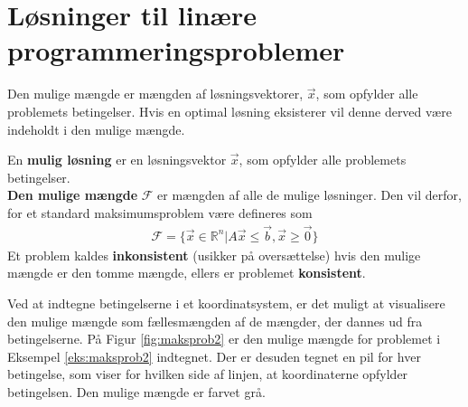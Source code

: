 \section{Løsninger til linære programmeringsproblemer}

Den mulige mængde er mængden af løsningsvektorer, $\vec{x}$, som opfylder alle problemets betingelser. Hvis en optimal løsning eksisterer vil denne derved være indeholdt i den mulige mængde.

\begin{defn}
En \textbf{mulig løsning} er en løsningsvektor $\vec{x}$, som opfylder alle problemets betingelser.\\
\textbf{Den mulige mængde} $\mathcal{F}$ er mængden af alle de mulige løsninger. Den vil derfor, for et standard maksimumsproblem være defineres som
\begin{align*}
\mathcal{F}=\{\vec{x} \in \mathds{R}^n|A\vec{x} \leq \vec{b}, \vec{x} \geq \vec{0}\}
\end{align*}
Et problem kaldes \textbf{inkonsistent} (usikker på oversættelse) hvis den mulige mængde er den tomme mængde, ellers er problemet \textbf{konsistent}. %
\end{defn}


\begin{eks}
Ved at indtegne betingelserne i et koordinatsystem, er det muligt at visualisere den mulige mængde som fællesmængden af de mængder, der dannes ud fra betingelserne. På Figur \ref{fig:maksprob2} er den mulige mængde for problemet i Eksempel \ref{eks:maksprob2} indtegnet. Der er desuden tegnet en pil for hver betingelse, som viser for hvilken side af linjen, at koordinaterne opfylder betingelsen. Den mulige mængde er farvet grå.

\begin{center}
	
	\label{fig:maksprob2}
\end{center}

\end{eks}

